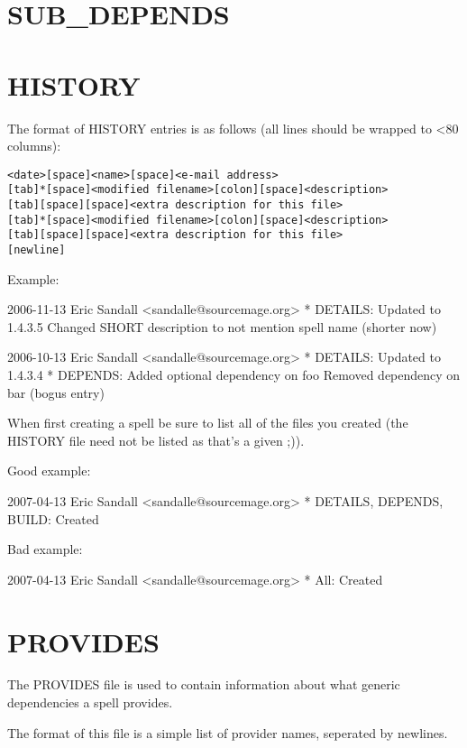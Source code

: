 \documentclass[a4paper,10pt]{book}
\begin{document}
\section{SUB\_DEPENDS}
\section{HISTORY}
The format of HISTORY entries is as follows (all lines should be wrapped
to <80 columns):
\begin{verbatim}
<date>[space]<name>[space]<e-mail address>
[tab]*[space]<modified filename>[colon][space]<description>
[tab][space][space]<extra description for this file>
[tab]*[space]<modified filename>[colon][space]<description>
[tab][space][space]<extra description for this file>
[newline]
\end{verbatim}

Example:
\begin{verbatim*}
2006-11-13 Eric Sandall <sandalle@sourcemage.org>
	* DETAILS: Updated to 1.4.3.5
	  Changed SHORT description to not mention spell name (shorter now)

2006-10-13 Eric Sandall <sandalle@sourcemage.org>
	* DETAILS: Updated to 1.4.3.4
	* DEPENDS: Added optional dependency on foo
	  Removed dependency on bar (bogus entry)

\end{verbatim*}

When first creating a spell be sure to list all of the files you created (the
HISTORY file need not be listed as that's a given ;)).

Good example:
\begin{verbatim*}
2007-04-13 Eric Sandall <sandalle@sourcemage.org>
	* DETAILS, DEPENDS, BUILD: Created

\end{verbatim*}

Bad example:
\begin{verbatim*}
2007-04-13 Eric Sandall <sandalle@sourcemage.org>
	* All: Created

\end{verbatim*}

\section{PROVIDES}
The PROVIDES file is used to contain information about what generic
dependencies a spell provides.

The format of this file is a simple list of provider names, seperated by
newlines.
\end{document}
